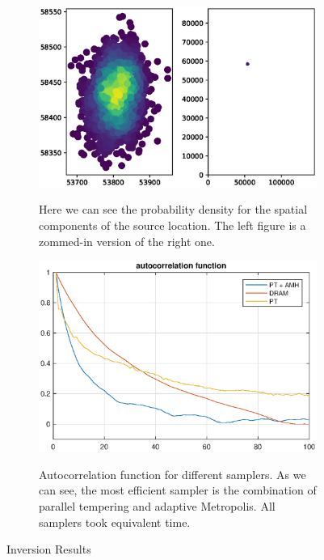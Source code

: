 \begin{figure}
	\centering
	\begin{subfigure}[a]{0.4\textwidth}
	\includegraphics[width=\textwidth]{figures/dens}
		\label{fig:dens}
	\caption{Here we can see the probability density for the spatial components of the source location. The left figure is a zommed-in version of the right one. }
	\end{subfigure}
	\begin{subfigure}[b]{0.4\textwidth}
	\includegraphics[width=\textwidth]{figures/acf_tanz}
		\label{fig:acf}
		\caption{Autocorrelation function for different samplers. As we can see, the most efficient sampler is the combination of parallel tempering and adaptive Metropolis. All samplers took equivalent time.  }
	\end{subfigure}
	\caption{Inversion Results}\label{fig:animals}
\end{figure}

